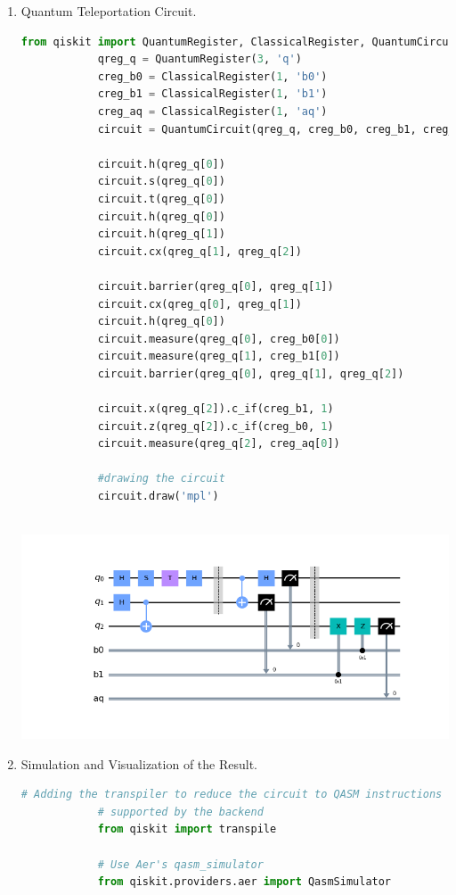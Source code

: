 \documentclass[12pt, a4paper]{article}
\begin{document}
	\begin{enumerate}
		\item Quantum Teleportation Circuit.
		\begin{lstlisting}[language=Python, caption= Circuit]
			from qiskit import QuantumRegister, ClassicalRegister, QuantumCircuit
			qreg_q = QuantumRegister(3, 'q')
			creg_b0 = ClassicalRegister(1, 'b0')
			creg_b1 = ClassicalRegister(1, 'b1')
			creg_aq = ClassicalRegister(1, 'aq')
			circuit = QuantumCircuit(qreg_q, creg_b0, creg_b1, creg_aq)
			
			circuit.h(qreg_q[0])
			circuit.s(qreg_q[0])
			circuit.t(qreg_q[0])
			circuit.h(qreg_q[0])
			circuit.h(qreg_q[1])
			circuit.cx(qreg_q[1], qreg_q[2])
			
			circuit.barrier(qreg_q[0], qreg_q[1])
			circuit.cx(qreg_q[0], qreg_q[1])
			circuit.h(qreg_q[0])
			circuit.measure(qreg_q[0], creg_b0[0])
			circuit.measure(qreg_q[1], creg_b1[0])
			circuit.barrier(qreg_q[0], qreg_q[1], qreg_q[2])
			
			circuit.x(qreg_q[2]).c_if(creg_b1, 1)
			circuit.z(qreg_q[2]).c_if(creg_b0, 1)
			circuit.measure(qreg_q[2], creg_aq[0])
			
			#drawing the circuit
			circuit.draw('mpl')
			
		\end{lstlisting}
		
		\includegraphics[scale=0.4]{circuit.png}
		
		\item Simulation and Visualization of the Result.
		\begin{lstlisting}[language=Python, caption= Simulation and Visualization]
			# Adding the transpiler to reduce the circuit to QASM instructions
			# supported by the backend
			from qiskit import transpile
			
			# Use Aer's qasm_simulator
			from qiskit.providers.aer import QasmSimulator
			

\end{lstlisting}
\end{enumerate}
\end{document}
